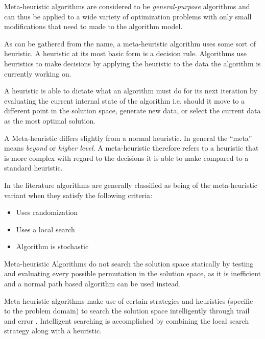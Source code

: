 Meta-heuristic algorithms are considered to be \emph{general-purpose} algorithms and can thus be applied to a wide variety of optimization problems with only small modifications that need to made to the algorithm model\cite{MetaGraph}.

As can be gathered from the name, a meta-heuristic algorithm uses some sort of heuristic. A heuristic at its most basic form is a decision rule. Algorithms use heuristics to make decisions by applying the heuristic to the data the algorithm is currently working on\cite{AIModernApproach,NatureInspiredMetaHeuristic}.

A heuristic is able to dictate what an algorithm must do for its next iteration by evaluating the current internal state of the algorithm  i.e. should it move to a different point in the solution space, generate new data, or select the current data as the most optimal solution\cite{AIModernApproach,NatureInspiredMetaHeuristic}.

A Meta-heuristic differs slightly from a normal heuristic. In general the ``meta'' means \emph{beyond} or \emph{higher level}\cite{AIModernApproach,NatureInspiredMetaHeuristic}. A meta-heuristic therefore refers to a heuristic that is more complex with regard to the decisions it is able to make compared to a standard heuristic\cite{AIModernApproach,NatureInspiredMetaHeuristic}.

In the literature algorithms are generally classified as being of the meta-heuristic variant when they satisfy the following criteria\cite{AIModernApproach,NatureInspiredMetaHeuristic}:
\begin{itemize}
	\item Uses randomization
	\item Uses a local search
	\item Algorithm is stochastic
\end{itemize}

Meta-heuristic Algorithms do not search the solution space statically by testing and evaluating every possible permutation in the solution space, as it is inefficient and a normal path based algorithm can be used instead\cite{MetaAgricultural}.

Meta-heuristic algorithms make use of certain strategies and heuristics (specific to the problem domain) to search the solution space intelligently through trail and error \cite{MetaAgricultural}. Intelligent searching is accomplished by combining the local search strategy along with a heuristic\cite{NatureInspiredMetaHeuristic,AIModernApproach,CompuIntelligenceIntro}. 

